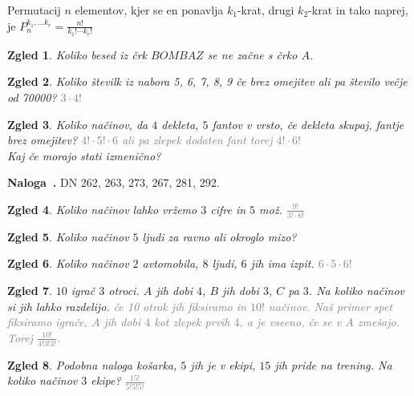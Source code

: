\documentclass{article}
\newcounter{example}[section]
\newenvironment{example}[1][]{\refstepcounter{example}\par\medskip
   \noindent \textbf{Naloga~\theexample. #1} \rmfamily}{\medskip}
\newtheorem*{zgled}{Zgled}
\begin{document}
Permutacij $n$ elementov, kjer se en ponavlja $k_1$-krat, drugi $k_2$-krat in tako naprej, je $P_n ^{k_1,\ldots k_r}=\frac{n!}{k_1 ! \cdots k_r !}$

\begin{zgled}
    Koliko besed iz črk $BOMBAZ$ se ne začne s črko $A$.
\end{zgled}

\begin{zgled}
    Koliko številk iz nabora 5, 6, 7, 8, 9 če brez omejitev ali pa število večje od 70000? \textcolor{gray}{$3\cdot4!$}
\end{zgled}

\begin{zgled}
    Koliko načinov, da $4$ dekleta, $5$ fantov v vrsto, če dekleta skupaj, fantje brez omejitev? \textcolor{gray}{$4!\cdot 5!\cdot 6$ ali pa zlepek dodaten fant torej $4!\cdot 6!$}\\
    Kaj če morajo stati izmenično?
\end{zgled}

\begin{example}
    DN 262, 263, 273, 267, 281, 292.
\end{example}

\begin{zgled}
    Koliko načinov lahko vržemo $3$ cifre in $5$ mož. \textcolor{gray}{$\frac{9!}{3!\cdot 6!}$}
\end{zgled}

\begin{zgled}
    Koliko načinov $5$ ljudi za ravno ali okroglo mizo?
\end{zgled}

\begin{zgled}
    Koliko načinov $2$ avtomobila, $8$ ljudi, $6$ jih ima izpit. \textcolor{gray}{$6\cdot 5\cdot 6!$}
\end{zgled}

\begin{zgled}
    $10$ igrač $3$ otroci. $A$ jih dobi $4$, $B$ jih dobi $3$, $C$ pa $3$. Na koliko načinov si jih lahko razdelijo. \textcolor{gray}{če 10 otrok jih fiksiramo in $10!$ načinov. Naš primer spet fiksiramo igrače, $A$ jih dobi $4$ kot zlepek prvih $4$, a je vseeno, če se v $A$ zmešajo. Torej $\frac{10!}{4!3!3!}$.}
\end{zgled}

\begin{zgled}
    Podobna naloga košarka, $5$ jih je v ekipi, $15$ jih pride na trening. Na koliko načinov $3$ ekipe? \textcolor{gray}{$\frac{15!}{5!5!5!}$}
\end{zgled}
\end{document}
